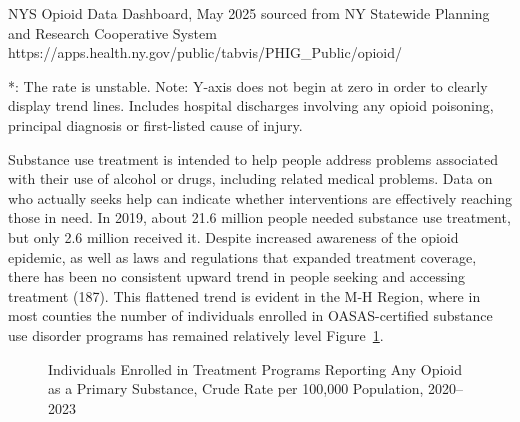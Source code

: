 \documentclass[
  english,
  letterpaper,
]{report}
\begin{document}
\begin{tcolorbox}[enhanced jigsaw, breakable, leftrule=.75mm, title=\textcolor{quarto-callout-note-color}{\faInfo}\hspace{0.5em}{Source}, bottomrule=.15mm, opacityback=0, left=2mm, colback=white, bottomtitle=1mm, coltitle=black, colbacktitle=quarto-callout-note-color!10!white, colframe=quarto-callout-note-color-frame, opacitybacktitle=0.6, toptitle=1mm, titlerule=0mm, arc=.35mm, rightrule=.15mm, toprule=.15mm]

NYS Opioid Data Dashboard, May 2025 sourced from NY Statewide Planning
and Research Cooperative System
https://apps.health.ny.gov/public/tabvis/PHIG\_Public/opioid/

\end{tcolorbox}

\begin{tcolorbox}[enhanced jigsaw, breakable, leftrule=.75mm, title=\textcolor{quarto-callout-note-color}{\faInfo}\hspace{0.5em}{Note}, bottomrule=.15mm, opacityback=0, left=2mm, colback=white, bottomtitle=1mm, coltitle=black, colbacktitle=quarto-callout-note-color!10!white, colframe=quarto-callout-note-color-frame, opacitybacktitle=0.6, toptitle=1mm, titlerule=0mm, arc=.35mm, rightrule=.15mm, toprule=.15mm]

*: The rate is unstable. Note: Y-axis does not begin at zero in order to
clearly display trend lines. Includes hospital discharges involving any
opioid poisoning, principal diagnosis or first-listed cause of injury.

\end{tcolorbox}

Substance use treatment is intended to help people address problems
associated with their use of alcohol or drugs, including related medical
problems. Data on who actually seeks help can indicate whether
interventions are effectively reaching those in need. In 2019, about
21.6 million people needed substance use treatment, but only 2.6 million
received it. Despite increased awareness of the opioid epidemic, as well
as laws and regulations that expanded treatment coverage, there has been
no consistent upward trend in people seeking and accessing treatment
(187). This flattened trend is evident in the M-H Region, where in most
counties the number of individuals enrolled in OASAS-certified substance
use disorder programs has remained relatively level
Figure~\ref{fig-treat-prog-opioid-crude}.

\begin{figure}


\caption{\label{fig-treat-prog-opioid-crude}Individuals Enrolled in
Treatment Programs Reporting Any Opioid as a Primary Substance, Crude
Rate per 100,000 Population, 2020--2023}

\end{figure}%
\end{document}
